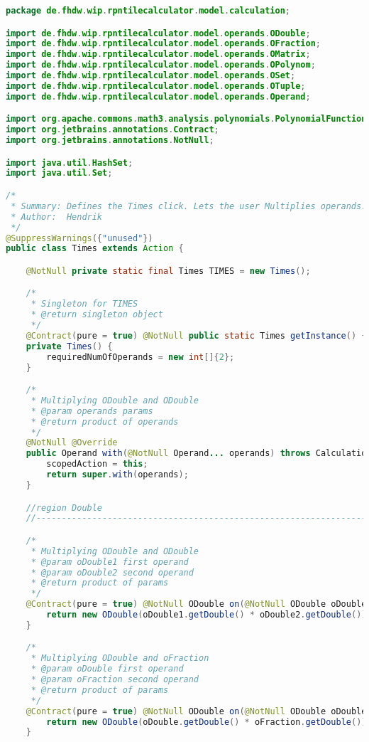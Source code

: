 \begin{lstlisting}[caption=Times (Falk),label=list:Times,language=Java]
package de.fhdw.wip.rpntilecalculator.model.calculation;

import de.fhdw.wip.rpntilecalculator.model.operands.ODouble;
import de.fhdw.wip.rpntilecalculator.model.operands.OFraction;
import de.fhdw.wip.rpntilecalculator.model.operands.OMatrix;
import de.fhdw.wip.rpntilecalculator.model.operands.OPolynom;
import de.fhdw.wip.rpntilecalculator.model.operands.OSet;
import de.fhdw.wip.rpntilecalculator.model.operands.OTuple;
import de.fhdw.wip.rpntilecalculator.model.operands.Operand;

import org.apache.commons.math3.analysis.polynomials.PolynomialFunction;
import org.jetbrains.annotations.Contract;
import org.jetbrains.annotations.NotNull;

import java.util.HashSet;
import java.util.Set;

/*
 * Summary: Defines the Times click. Lets the user Multiplies operands.
 * Author:  Hendrik
 */
@SuppressWarnings({"unused"})
public class Times extends Action {

    @NotNull private static final Times TIMES = new Times();

    /*
     * Singleton for TIMES
     * @return singleton object
     */
    @Contract(pure = true) @NotNull public static Times getInstance() { return TIMES; }
    private Times() {
        requiredNumOfOperands = new int[]{2};
    }

    /*
     * Multiplying ODouble and ODouble
     * @param operands params
     * @return product of operands
     */
    @NotNull @Override
    public Operand with(@NotNull Operand... operands) throws CalculationException {
        scopedAction = this;
        return super.with(operands);
    }

    //region Double
    //------------------------------------------------------------------------------------

    /*
     * Multiplying ODouble and ODouble
     * @param oDouble1 first operand
     * @param oDouble2 second operand
     * @return product of params
     */
    @Contract(pure = true) @NotNull ODouble on(@NotNull ODouble oDouble1, @NotNull ODouble oDouble2) {
        return new ODouble(oDouble1.getDouble() * oDouble2.getDouble());
    }

    /*
     * Multiplying ODouble and oFraction
     * @param oDouble first operand
     * @param oFraction second operand
     * @return product of params
     */
    @Contract(pure = true) @NotNull ODouble on(@NotNull ODouble oDouble, @NotNull OFraction oFraction) {
        return new ODouble(oDouble.getDouble() * oFraction.getDouble());
    }


\end{lstlisting}
